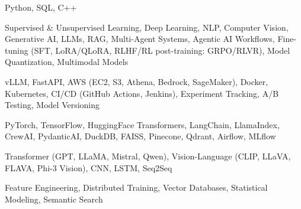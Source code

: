 \documentclass[letter,10pt]{article}
\begin{document}
 Python, SQL, C++\par\vspace{2pt}

 Supervised \& Unsupervised Learning, Deep Learning, NLP, Computer Vision, Generative AI, LLMs, RAG, Multi-Agent Systems, Agentic AI Workflows, Fine-tuning (SFT, LoRA/QLoRA, RLHF/RL post-training: GRPO/RLVR), Model Quantization, Multimodal Models\par\vspace{2pt}

 vLLM, FastAPI, AWS (EC2, S3, Athena, Bedrock, SageMaker), Docker, Kubernetes, CI/CD (GitHub Actions, Jenkins), Experiment Tracking, A/B Testing, Model Versioning\par\vspace{2pt}

 PyTorch, TensorFlow, HuggingFace Transformers, LangChain, LlamaIndex, CrewAI, PydanticAI, DuckDB, FAISS, Pinecone, Qdrant, Airflow, MLflow\par\vspace{2pt}

 Transformer (GPT, LLaMA, Mistral, Qwen), Vision-Language (CLIP, LLaVA, FLAVA, Phi-3 Vision), CNN, LSTM, Seq2Seq\par\vspace{2pt}

 Feature Engineering, Distributed Training, Vector Databases, Statistical Modeling, Semantic Search
\end{document}
